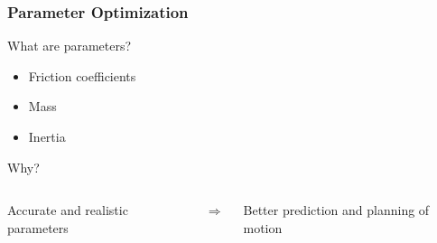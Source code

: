
\begin{frame}[c]
	\frametitle{Parameter Optimization}
		What are parameters?
		\begin{itemize}
			\item{Friction coefficients}
			\item{Mass}
			\item{Inertia}
		\end{itemize}
	\vspace{0.5cm}
		Why?
		\begin{columns}
				\centering
				\begin{tcolorbox}[width=\textwidth,colback={TUMblue2}]
					Accurate and realistic parameters
				\end{tcolorbox}
				\centering
				\Huge{$\Rightarrow$}
				\begin{tcolorbox}[width=\textwidth,colback={TUMblue3}]
					Better prediction and planning of motion
				\end{tcolorbox}
		\end{columns}
\end{frame}